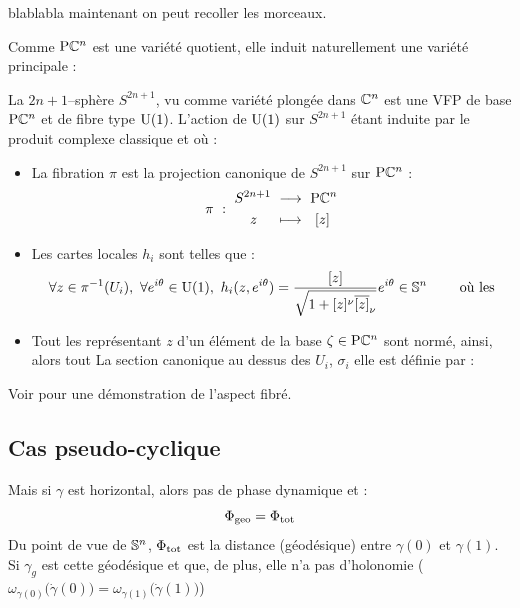 blablabla maintenant on peut recoller les morceaux.
 



Comme $\PC{n}$ est une variété quotient, elle induit naturellement une variété principale :
\begin{proposition}
	La $2n+1$--sphère $S^{2n+1}$, vu comme variété plongée dans $\C^n$ est une VFP de base $\PC{n}$ et de fibre type $\U{1}$. L'action de $\U{1}$ sur $S^{2n+1}$ étant induite par le produit complexe classique et où :
	\begin{itemize}
		\item La fibration $\pi$ est la projection canonique de $S^{2n+1}$ sur $\PC{n}$ :
		\[\pi\ :\ \begin{aligned}S^{2n+1}\ &\lr\ \PC{n} \\ z\quad\ &\lmt\ \ [z]\end{aligned}\]
		
		\item Les cartes locales $h_i$ sont telles que :
		\[\forall z \in \pi^{-1}(U_i),\ \forall e^{i\theta}\in\U{1},\  h_i(z,e^{i\theta}) = \frac{[z]}{\sqrt{1 + [z]^\nu \congu{[z]}_\nu}}e^{i\theta} \in \S{n}\qquad \text{ où les}\]
		
		\item Tout les représentant $z$ d'un élément de la base $\zeta\in\PC{n}$ sont normé, ainsi, alors tout La section canonique au dessus des $U_i$, $\sigma_i$ elle est définie par :
		\[\]
		
	\end{itemize}
	
	Voir \cite[lemme 2.17]{lafontaine_introduction_2015} pour une démonstration de l'aspect fibré.
\end{proposition}




\subsection{Cas pseudo-cyclique}

Mais si $\gamma$ est horizontal, alors pas de phase dynamique et :
\[\phaseg  = \phaset\]
Du point de vue de $\S{n}$, $\phaset$ est la distance (géodésique) entre $\gamma(0)$ et $\gamma(1)$.
Si $\gamma_g$ est cette géodésique et que, de plus, elle n'a pas d'holonomie (\ie~ $ \omega_{\gamma(0)}\big(\dot{\gamma}(0)\big) = \omega_{\gamma(1)}\big(\dot{\gamma}(1)\big)$)








